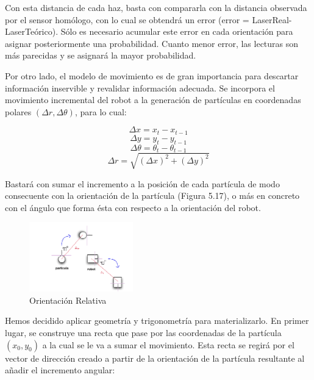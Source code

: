 Con esta distancia de cada haz, basta con compararla con la distancia observada por el sensor homólogo, con lo cual se obtendrá un error (error = LaserReal- LaserTeórico). Sólo es necesario acumular este error en cada orientación para asignar posteriormente una probabilidad. Cuanto menor error, las lecturas son más parecidas y se asignará la mayor probabilidad.

Por otro lado, el modelo de movimiento es de gran importancia para descartar información inservible y revalidar información adecuada. Se incorpora el movimiento incremental del robot a la generación de partículas en coordenadas polares $(\Delta r, \Delta\theta)$, para lo cual: 

\begin{equation}
\Delta x = x_{t} - x_{t-1}
\end{equation}
\begin{equation}
\Delta y = y_{t} - y_{t-1}
\end{equation}
\begin{equation}
\Delta\theta = \theta_{t} - \theta_{t-1}
\end{equation}
\begin{equation}
\Delta r = \sqrt{(\Delta x)^2+(\Delta y)^2}
\end{equation}

Bastará con sumar el incremento a la posición de cada partícula de modo consecuente con la orientación de la partícula (Figura 5.17), o más en concreto con el ángulo que forma ésta con respecto a la orientación del robot.

\begin{figure}[H]
\begin{center}
	\includegraphics[width=0.4\textwidth]{figures/orientacionrelativa.png}
	\caption{Orientación Relativa}
	\label{fig.orientacionrelativa}
	\end{center}
\end{figure}

Hemos decidido aplicar geometría y trigonometría para materializarlo. En primer lugar, se construye una recta que pase por las coordenadas de la partícula $(x_{0},y_{0})$ a la cual se le va a sumar el movimiento. Esta recta se regirá por el vector de dirección creado a partir de la orientación de la partícula resultante al añadir el incremento angular:

